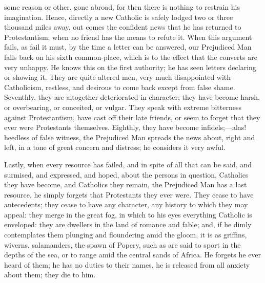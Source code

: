 some reason or other, gone abroad, for then there is
nothing to restrain his imagination. Hence, directly a
new Catholic is safely lodged two or three thousand miles
away, out comes the confident news that he has returned
to Protestantism; when no friend has the means to refute
it. When this argument fails, as fail it must, by the
time a letter can be answered, our Prejudiced Man falls
back on his sixth common-place, which is to the effect
that the converts are very unhappy. He knows this on the
first authority; he has seen letters declaring or showing
it. They are quite altered men, very much disappointed
with Catholicism, restless, and desirous to come back
except from false shame. Seventhly, they are altogether
deteriorated in character; they have become harsh, or
overbearing, or conceited, or vulgar. They speak with
extreme bitterness against Protestantism, have cast off
their late friends, or seem to forget that they ever were
Protestants themselves. Eighthly, they have become
infidels;—alas! heedless of false witness, the
Prejudiced Man spreads the news about, right and left, in
a tone of great concern and distress; he considers it
very awful.

Lastly, when every resource has failed, and in spite
of all that can be said, and surmised, and expressed, and
hoped, about the persons in question, Catholics they have
become, and Catholics they remain, the Prejudiced Man has
a last resource, he simply forgets that Protestants they
ever were. They cease to have antecedents; they cease to
have any character, any history to which they may appeal:
they merge in the great fog, in which to his eyes
everything Catholic is enveloped: they are dwellers in
the land of romance and fable; and, if he dimly
contemplates them plunging and floundering amid the
gloom, it is as griffins, wiverns, salamanders, the spawn
of Popery, such as are said to sport in the depths of the
sea, or to range amid the central sands of Africa. He
forgets he ever heard of them; he has no duties to their
names, he is released from all anxiety about them; they
die to him.

